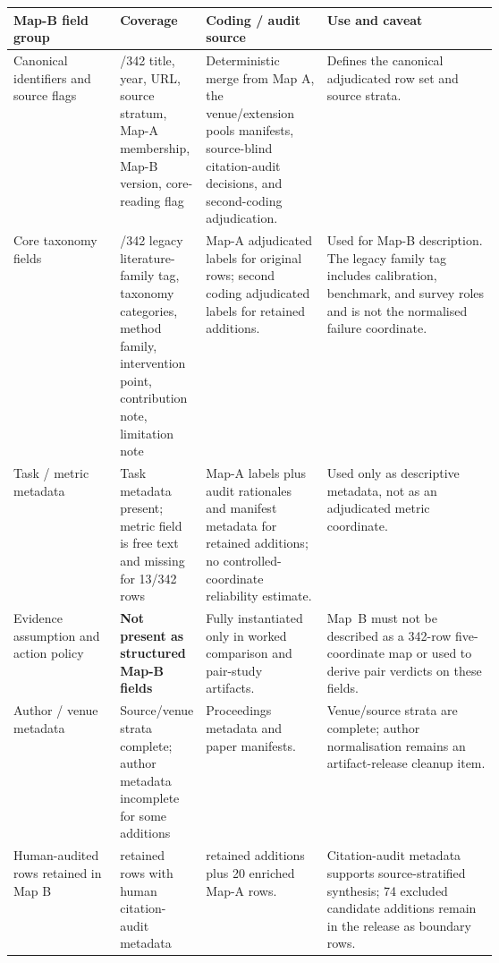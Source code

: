 \begin{table}[t]
\centering
\scriptsize
\renewcommand{\arraystretch}{0.9}
\begin{tabularx}{\linewidth}{>{\raggedright\arraybackslash}p{0.22\linewidth}>{\raggedright\arraybackslash}p{0.16\linewidth}>{\raggedright\arraybackslash}p{0.25\linewidth}X}
\toprule
\textbf{Map-B field group} & \textbf{Coverage} & \textbf{Coding / audit source} & \textbf{Use and caveat} \\
\midrule
Canonical identifiers and source flags & 342/342 title, year, URL, source stratum, Map-A membership, Map-B version, core-reading flag & Deterministic merge from Map A, the venue/extension pools manifests, source-blind citation-audit decisions, and second-coding adjudication. & Defines the canonical adjudicated row set and source strata. \\
Core taxonomy fields & 342/342 legacy literature-family tag, taxonomy categories, method family, intervention point, contribution note, limitation note & Map-A adjudicated labels for original rows; second coding adjudicated labels for retained additions. & Used for Map-B description. The legacy family tag includes calibration, benchmark, and survey roles and is not the normalised failure coordinate. \\
Task / metric metadata & Task metadata present; metric field is free text and missing for 13/342 rows & Map-A labels plus audit rationales and manifest metadata for retained additions; no controlled-coordinate reliability estimate. & Used only as descriptive metadata, not as an adjudicated metric coordinate. \\
Evidence assumption and action policy & \textbf{Not present as structured Map-B fields} & Fully instantiated only in worked comparison and pair-study artifacts. & Map~B must not be described as a 342-row five-coordinate map or used to derive pair verdicts on these fields. \\
Author / venue metadata & Source/venue strata complete; author metadata incomplete for some additions & Proceedings metadata and paper manifests. & Venue/source strata are complete; author normalisation remains an artifact-release cleanup item. \\
Human-audited rows retained in Map B & 94 retained rows with human citation-audit metadata & 74 retained additions plus 20 enriched Map-A rows. & Citation-audit metadata supports source-stratified synthesis; 74 excluded candidate additions remain in the release as boundary rows. \\

\end{tabularx}
\end{table}
